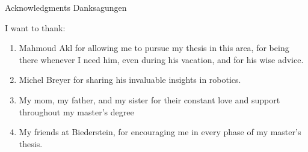 \makeatletter
{}
{}
{}
\makeatother
\thispagestyle{empty}

\vspace*{20mm}

\begin{center}
\makeatletter
{}
{ Acknowledgments}
{ Danksagungen}
\makeatother
\end{center}

\vspace{10mm}

I want to thank:
\begin{enumerate}
    \item  Mahmoud Akl for allowing me to pursue my thesis in this area, for being there whenever I need him, even during his vacation, and for his wise advice.
    \item Michel Breyer for sharing his invaluable insights in robotics.
    \item My mom, my father, and my sister for their constant love and support throughout my master's degree
    \item My friends at Biederstein, for encouraging me in every phase of my master's thesis.
\end{enumerate}

\cleardoublepage{}
